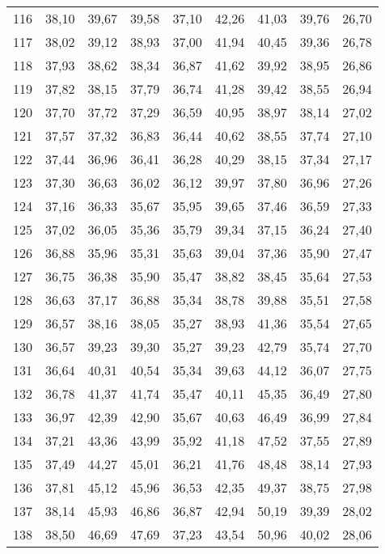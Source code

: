 \begin{longtable}{c c c c c c c c c}
      116& 	38,10& 	39,67& 	39,58& 	37,10& 	42,26& 	41,03& 	39,76& 	26,70 \\
      117& 	38,02& 	39,12& 	38,93& 	37,00& 	41,94& 	40,45& 	39,36& 	26,78 \\
      118& 	37,93& 	38,62& 	38,34& 	36,87& 	41,62& 	39,92& 	38,95& 	26,86 \\
      119& 	37,82& 	38,15& 	37,79& 	36,74& 	41,28& 	39,42& 	38,55& 	26,94 \\
      120& 	37,70& 	37,72& 	37,29& 	36,59& 	40,95& 	38,97& 	38,14& 	27,02 \\
      121& 	37,57& 	37,32& 	36,83& 	36,44& 	40,62& 	38,55& 	37,74& 	27,10 \\
      122& 	37,44& 	36,96& 	36,41& 	36,28& 	40,29& 	38,15& 	37,34& 	27,17 \\
      123& 	37,30& 	36,63& 	36,02& 	36,12& 	39,97& 	37,80& 	36,96& 	27,26 \\
      124& 	37,16& 	36,33& 	35,67& 	35,95& 	39,65& 	37,46& 	36,59& 	27,33 \\
      125& 	37,02& 	36,05& 	35,36& 	35,79& 	39,34& 	37,15& 	36,24& 	27,40 \\
      126& 	36,88& 	35,96& 	35,31& 	35,63& 	39,04& 	37,36& 	35,90& 	27,47 \\
      127& 	36,75& 	36,38& 	35,90& 	35,47& 	38,82& 	38,45& 	35,64& 	27,53 \\
      128& 	36,63& 	37,17& 	36,88& 	35,34& 	38,78& 	39,88& 	35,51& 	27,58 \\
      129& 	36,57& 	38,16& 	38,05& 	35,27& 	38,93& 	41,36& 	35,54& 	27,65 \\
      130& 	36,57& 	39,23& 	39,30& 	35,27& 	39,23& 	42,79& 	35,74& 	27,70 \\
      131& 	36,64& 	40,31& 	40,54& 	35,34& 	39,63& 	44,12& 	36,07& 	27,75 \\
      132& 	36,78& 	41,37& 	41,74& 	35,47& 	40,11& 	45,35& 	36,49& 	27,80 \\
      133& 	36,97& 	42,39& 	42,90& 	35,67& 	40,63& 	46,49& 	36,99& 	27,84 \\
      134& 	37,21& 	43,36& 	43,99& 	35,92& 	41,18& 	47,52& 	37,55& 	27,89 \\
      135& 	37,49& 	44,27& 	45,01& 	36,21& 	41,76& 	48,48& 	38,14& 	27,93 \\
      136& 	37,81& 	45,12& 	45,96& 	36,53& 	42,35& 	49,37& 	38,75& 	27,98 \\
      137& 	38,14& 	45,93& 	46,86& 	36,87& 	42,94& 	50,19& 	39,39& 	28,02 \\
      138& 	38,50& 	46,69& 	47,69& 	37,23& 	43,54& 	50,96& 	40,02& 	28,06 \\

\end{longtable}
